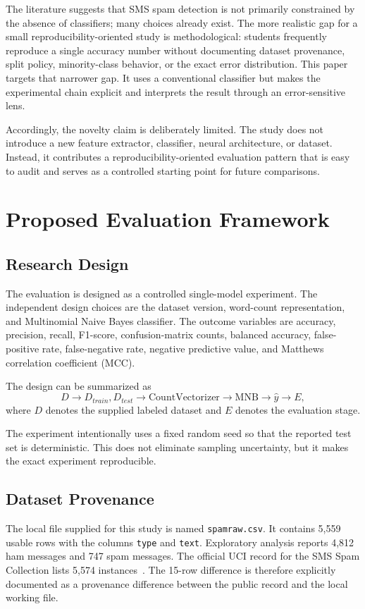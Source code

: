 \documentclass[conference]{IEEEtran}
\begin{document}
The literature suggests that SMS spam detection is not primarily constrained by the absence of classifiers; many choices already exist. The more realistic gap for a small reproducibility-oriented study is methodological: students frequently reproduce a single accuracy number without documenting dataset provenance, split policy, minority-class behavior, or the exact error distribution. This paper targets that narrower gap. It uses a conventional classifier but makes the experimental chain explicit and interprets the result through an error-sensitive lens.

Accordingly, the novelty claim is deliberately limited. The study does not introduce a new feature extractor, classifier, neural architecture, or dataset. Instead, it contributes a reproducibility-oriented evaluation pattern that is easy to audit and serves as a controlled starting point for future comparisons.

\section{Proposed Evaluation Framework}
\subsection{Research Design}
The evaluation is designed as a controlled single-model experiment. The independent design choices are the dataset version, word-count representation, and Multinomial Naive Bayes classifier. The outcome variables are accuracy, precision, recall, F1-score, confusion-matrix counts, balanced accuracy, false-positive rate, false-negative rate, negative predictive value, and Matthews correlation coefficient (MCC).

The design can be summarized as
\begin{equation}
D \rightarrow D_{train},D_{test} \rightarrow \mathrm{CountVectorizer} \rightarrow \mathrm{MNB} \rightarrow \hat{y} \rightarrow E,
\end{equation}
where $D$ denotes the supplied labeled dataset and $E$ denotes the evaluation stage.

The experiment intentionally uses a fixed random seed so that the reported test set is deterministic. This does not eliminate sampling uncertainty, but it makes the exact experiment reproducible.

\subsection{Dataset Provenance}
The local file supplied for this study is named \texttt{spamraw.csv}. It contains 5,559 usable rows with the columns \texttt{type} and \texttt{text}. Exploratory analysis reports 4,812 ham messages and 747 spam messages. The official UCI record for the SMS Spam Collection lists 5,574 instances~\cite{uci_sms}. The 15-row difference is therefore explicitly documented as a provenance difference between the public record and the local working file.
\end{document}
